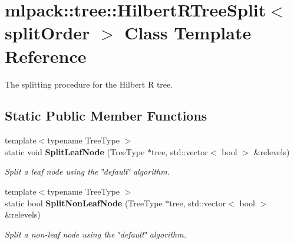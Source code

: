 \section{mlpack\+:\+:tree\+:\+:Hilbert\+R\+Tree\+Split$<$ split\+Order $>$ Class Template Reference}
\label{classmlpack_1_1tree_1_1HilbertRTreeSplit}


The splitting procedure for the Hilbert R tree.  


\subsection*{Static Public Member Functions}
\begin{DoxyCompactItemize}
\item 
{\footnotesize template$<$typename Tree\+Type $>$ }\\static void {\bf Split\+Leaf\+Node} (Tree\+Type $\ast$tree, std\+::vector$<$ bool $>$ \&relevels)
\begin{DoxyCompactList}\small\item\em Split a leaf node using the \char`\"{}default\char`\"{} algorithm. \end{DoxyCompactList}\item 
{\footnotesize template$<$typename Tree\+Type $>$ }\\static bool {\bf Split\+Non\+Leaf\+Node} (Tree\+Type $\ast$tree, std\+::vector$<$ bool $>$ \&relevels)
\begin{DoxyCompactList}\small\item\em Split a non-\/leaf node using the \char`\"{}default\char`\"{} algorithm. \end{DoxyCompactList}\end{DoxyCompactItemize}

